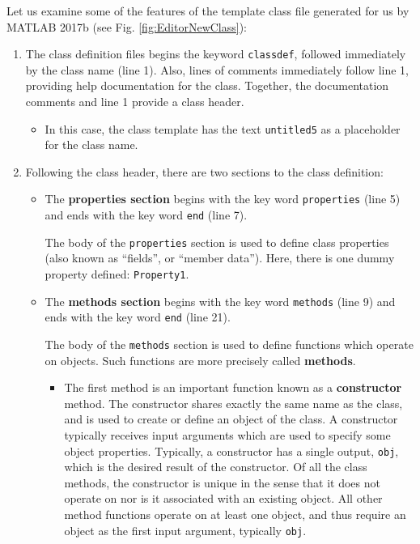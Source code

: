 Let us examine some of the features of the template class file generated for us by MATLAB 2017b (see Fig. \ref{fig:EditorNewClass}):
\begin{enumerate}
\item The class definition files begins the keyword \texttt{classdef}, followed immediately by the class name (line 1). Also, lines of comments immediately follow line 1, providing help documentation for the class. Together, the documentation comments and line 1 provide a class header. 
\begin{itemize}
\item In this case, the class template has the text \texttt{untitled5} as a placeholder for the class name.
\end{itemize}

\item Following the class header, there are two sections to the class definition:
\begin{itemize}
\item The \textbf{properties section} begins with the key word \texttt{properties} (line 5) and ends with the key word \texttt{end} (line 7).

The body of the \texttt{properties} section is used to define class properties (also known as ``fields'', or ``member data''). Here, there is one dummy property defined: \texttt{Property1}.

\item The \textbf{methods section} begins with the key word \texttt{methods} (line 9) and ends with the key word \texttt{end} (line 21).

The body of the \texttt{methods} section is used to define functions which operate on objects. Such functions are more precisely called \textbf{methods}.

\begin{itemize}
\item The first method is an important function known as a \textbf{constructor} method. The constructor shares exactly the same name as the class, and is used to create or define an object of the class. A constructor typically receives input arguments which are used to specify some object properties. Typically, a constructor has a single output, \texttt{obj}, which is the desired result of the constructor. Of all the class methods, the constructor is unique in the sense that it does not operate on nor is it associated with an existing object. All other method functions operate on at least one object, and thus require an object as the first input argument, typically \texttt{obj}.


\end{itemize}
\end{itemize}
\end{enumerate}
